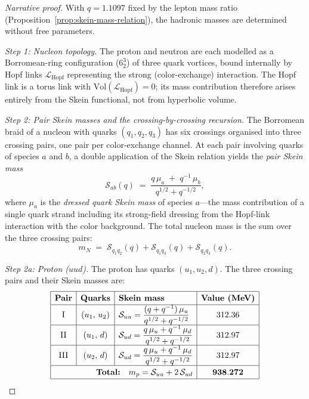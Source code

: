 \begin{proof}[Narrative proof]
With $q = 1.1097$ fixed by the lepton mass ratio
(Proposition~\ref{prop:skein-mass-relation}), the hadronic masses are
determined without free parameters.

\emph{Step 1: Nucleon topology.}
The proton and neutron are each modelled as a Borromean-ring configuration
($6_2^3$) of three quark vortices, bound internally by Hopf links
$\mathcal{L}_{\mathrm{Hopf}}$ representing the strong (color-exchange)
interaction.  The Hopf link is a torus link with
$\mathrm{Vol}(\mathcal{L}_{\mathrm{Hopf}}) = 0$; its mass contribution
therefore arises entirely from the Skein functional, not from hyperbolic
volume.

\emph{Step 2: Pair Skein masses and the crossing-by-crossing recursion.}
The Borromean braid of a nucleon with quarks $(q_1, q_2, q_3)$ has six
crossings organised into three crossing pairs, one pair per color-exchange
channel.  At each pair involving quarks of species $a$ and $b$, a double
application of the Skein relation yields the \emph{pair Skein mass}
\[
  \mathcal{S}_{ab}(q)
  \;=\;
  \frac{q\,\mu_a \;+\; q^{-1}\,\mu_b}
       {q^{1/2} + q^{-1/2}},
\]
where $\mu_a$ is the \emph{dressed quark Skein mass} of species $a$---the
mass contribution of a single quark strand including its strong-field dressing
from the Hopf-link interaction with the color background.
The total nucleon mass is the sum over the three crossing pairs:
\[
  m_N
  \;=\;
  \mathcal{S}_{q_1 q_2}(q)
  + \mathcal{S}_{q_1 q_3}(q)
  + \mathcal{S}_{q_2 q_3}(q).
\]

\emph{Step 2a: Proton ($uud$).}
The proton has quarks $(u_1, u_2, d)$.  The three crossing pairs and their
Skein masses are:
\[
\renewcommand{\arraystretch}{1.3}
\begin{array}{|c|c|l|c|}
\hline
\textbf{Pair} & \textbf{Quarks} & \textbf{Skein mass}
  & \textbf{Value (MeV)} \\ \hline
\text{I}   & (u_1,\, u_2) &
  \displaystyle \mathcal{S}_{uu}
  = \frac{(q + q^{-1})\,\mu_u}{q^{1/2}+q^{-1/2}}
  & 312.36 \\ \hline
\text{II}  & (u_1,\, d)   &
  \displaystyle \mathcal{S}_{ud}
  = \frac{q\,\mu_u + q^{-1}\,\mu_d}{q^{1/2}+q^{-1/2}}
  & 312.97 \\ \hline
\text{III} & (u_2,\, d)   &
  \displaystyle \mathcal{S}_{ud}
  = \frac{q\,\mu_u + q^{-1}\,\mu_d}{q^{1/2}+q^{-1/2}}
  & 312.97 \\ \hline
\multicolumn{3}{|r|}{\textbf{Total:}\quad
  m_p = \mathcal{S}_{uu} + 2\,\mathcal{S}_{ud}}
  & \mathbf{938.272} \\ \hline
\end{array}
\]


\end{proof}
